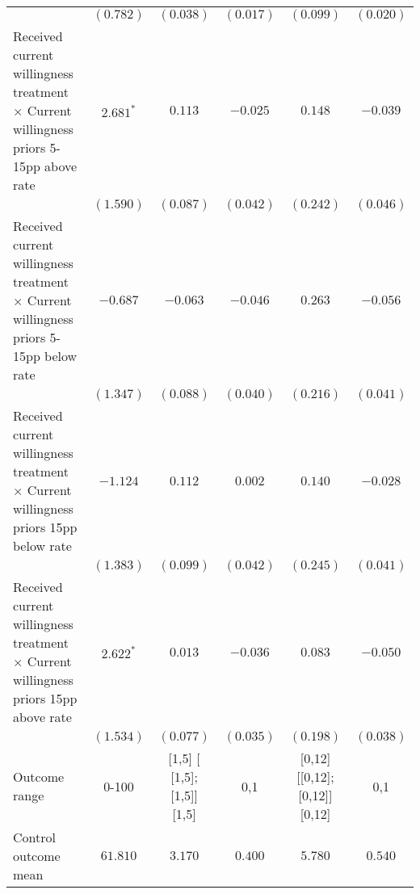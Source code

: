 \begin{table}
\begin{center}
\begin{tabular}{l c c c c c}
                                                                                             & $(0.782)$       & $(0.038)$                    & $(0.017)$      & $(0.099)$                     & $(0.020)$      \\
Received current willingness treatment $\times$ Current willingness priors 5-15pp above rate & $2.681^{*}$     & $0.113$                      & $-0.025$       & $0.148$                       & $-0.039$       \\
                                                                                             & $(1.590)$       & $(0.087)$                    & $(0.042)$      & $(0.242)$                     & $(0.046)$      \\
Received current willingness treatment $\times$ Current willingness priors 5-15pp below rate & $-0.687$        & $-0.063$                     & $-0.046$       & $0.263$                       & $-0.056$       \\
                                                                                             & $(1.347)$       & $(0.088)$                    & $(0.040)$      & $(0.216)$                     & $(0.041)$      \\
Received current willingness treatment $\times$ Current willingness priors 15pp below rate   & $-1.124$        & $0.112$                      & $0.002$        & $0.140$                       & $-0.028$       \\
                                                                                             & $(1.383)$       & $(0.099)$                    & $(0.042)$      & $(0.245)$                     & $(0.041)$      \\
Received current willingness treatment $\times$ Current willingness priors 15pp above rate   & $2.622^{*}$     & $0.013$                      & $-0.036$       & $0.083$                       & $-0.050$       \\
                                                                                             & $(1.534)$       & $(0.077)$                    & $(0.035)$      & $(0.198)$                     & $(0.038)$      \\
\hline
Outcome range                                                                                & 0-100           & [1,5] [ [1,5];  [1,5]] [1,5] & {0,1}          & [0,12] [[0,12]; [0,12]][0,12] & {0,1}          \\
Control outcome mean                                                                         & $61.810$        & $3.170$                      & $0.400$        & $5.780$                       & $0.540$        \\

\end{tabular}
\end{center}
\end{table}

